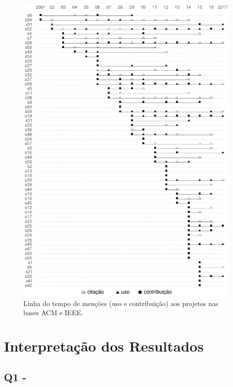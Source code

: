\begin{figure}[h]
  \center
  \includegraphics[scale=0.6]{imagens/mentions-timeline.png}
  \caption{Linha do tempo de menções (uso e contribuição) aos projetos nas bases ACM e IEEE.}
  \label{mentions-timeline}
\end{figure}


\section{Interpretação dos Resultados} \label{estudo2:interpretacao} %

\subsection{Q1 - \EstudoDoisQuestaoUm}

